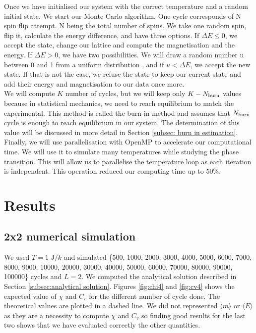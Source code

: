 \documentclass[english,notitlepage,reprint,nofootinbib]{revtex4-2}  %
\begin{document}
	Once we have initialised our system with the correct temperature and a random initial
	state. We start our Monte Carlo algorithm. One cycle corresponds of N spin flip attempt.
	N being the total number of spins. We take one random spin, flip it, calculate the
	energy difference, and have three options. If $\Delta E \le 0 $, we accept the state,
	change our lattice and compute the magnetisation and the energy. If $\Delta E > 0$, we have
	two possibilities. We will draw a random number u between 0 and 1 from a uniform distribution
	, and if $u < \Delta E$, we accept the new state. If that is not the case, we refuse the state to keep our current state and add their energy and magnetisation to our data once more. \\

	We will compute $K$ number of cycles, but we will keep only $K - N_{\rm burn}$ values
	because in statistical mechanics, we need to reach equilibrium to match the experimental.
	This method is called the burn-in method and assumes that $N_{\rm burn}$ cycle
	is enough to reach equilibrium in our system. The determination of this value will be
	discussed in more detail in Section \ref{subsec: burn in estimation}. \\

	Finally, we will use parallelisation with OpenMP to accelerate our computational time. We
	will use it to simulate many temperatures while studying the
	phase transition. This will allow us to parallelise the temperature loop as each iteration
	is independent. This operation reduced our computing time up to $50\%$.

	\section{Results}\label{sec:results}
	\subsection{2x2 numerical simulation}\label{subsec: 2x2 numerical}
	We used $T=1 \text{ J}/k$ and simulated \{500, 1000, 2000, 3000, 4000, 5000, 6000,
	7000, 8000, 9000, 10000, 20000, 30000, 40000, 50000, 60000, 70000, 80000, 90000, 100000\}
	cycles and $L=2$. We computed the analytical solution described in Section \ref{subsec:analytical solution}.
	Figures \ref{fig:chi4} and \ref{fig:cv4} shows the expected value of $\chi$ and $C_v$ for the different number of cycle done. The theoretical values are plotted in a dashed line. We did
	not represented $\langle m \rangle$ or $\langle E \rangle$ as they are a necessity to compute $\chi$ and $C_v$ so
	finding good results for the last two shows that we have evaluated correctly the other
	quantities.
\end{document}

